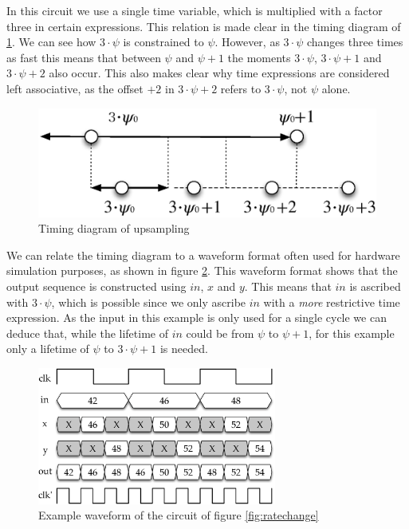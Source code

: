 In this circuit we use a single time variable, which is multiplied with a factor three in certain expressions.
This relation is made clear in the timing diagram of \ref{fig:constraintsup}.
We can see how $3 \cdot \psi$ is constrained to $\psi$.
However, as $3\cdot \psi$ changes three times as fast this means that between $\psi$ and $\psi + 1$ the moments $3 \cdot \psi$, $3 \cdot \psi +1$ and $3 \cdot \psi+2$ also occur.
This also makes clear why time expressions are considered left associative, as the offset $+2$ in $3 \cdot \psi + 2$ refers to $3 \cdot \psi$, not $\psi$ alone.

\begin{figure}
\centering
\includegraphics[width=0.5\linewidth]{images/constraintsup}
\caption{Timing diagram of upsampling}
\label{fig:constraintsup}
\end{figure}

We can relate the timing diagram to a waveform format often used for hardware simulation purposes, as shown in figure \ref{fig:ratechangetiming}.
This waveform format shows that the output sequence is constructed using $in$, $x$ and $y$.
This means that $in$ is ascribed with $3 \cdot \psi$, which is possible since we only ascribe $in$ with a \textit{more} restrictive time expression.
As the input in this example is only used for a single cycle we can deduce that, while the lifetime of $in$ could be from $\psi$ to $\psi+1$, for this example only a lifetime of $\psi$ to $3\cdot\psi+1$ is needed.

\begin{figure}[h]
\centering
\includegraphics[width=0.7\textwidth]{images/ratechangetiming}
\caption{Example waveform of the circuit of figure \ref{fig:ratechange}}
\label{fig:ratechangetiming}
\end{figure}

